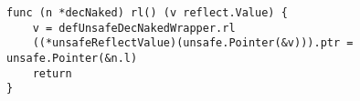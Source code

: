 \begin{lstlisting}[language=Golang, label=lst:labels-classexample-direct-memory-access, caption=Usage class example: direct-memory-access]
func (n *decNaked) rl() (v reflect.Value) {
    v = defUnsafeDecNakedWrapper.rl
    ((*unsafeReflectValue)(unsafe.Pointer(&v))).ptr = unsafe.Pointer(&n.l)
    return
}
\end{lstlisting}